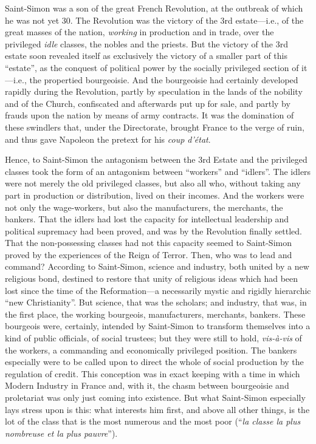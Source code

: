 Saint-Simon was a son of the great French Revolution, at the outbreak of which
he was not yet 30. The Revolution was the victory of the 3rd estate---i.e., of
the great masses of the nation, \emph{working} in production and in trade, over
the privileged \emph{idle} classes, the nobles and the priests. But the victory
of the 3rd estate soon revealed itself as exclusively the victory of a smaller
part of this ``estate'', as the conquest of political power by the socially
privileged section of it---i.e., the propertied bourgeoisie. And the bourgeoisie
had certainly developed rapidly during the Revolution, partly by speculation in
the lands of the nobility and of the Church, confiscated and afterwards put up
for sale, and partly by frauds upon the nation by means of army contracts. It
was the domination of these swindlers that, under the Directorate, brought
France to the verge of ruin, and thus gave Napoleon the pretext for his
\emph{coup d'état}.

Hence, to Saint-Simon the antagonism between the 3rd Estate and the privileged
classes took the form of an antagonism between ``workers'' and ``idlers''. The
idlers were not merely the old privileged classes, but also all who, without
taking any part in production or distribution, lived on their incomes. And the
workers were not only the wage-workers, but also the manufacturers, the
merchants, the bankers. That the idlers had lost the capacity for intellectual
leadership and political supremacy had been proved, and was by the Revolution
finally settled. That the non-possessing classes had not this capacity seemed to
Saint-Simon proved by the experiences of the Reign of Terror. Then, who was to
lead and command? According to Saint-Simon, science and industry, both united by
a new religious bond, destined to restore that unity of religious ideas which
had been lost since the time of the Reformation---a necessarily mystic and
rigidly hierarchic ``new Christianity''. But science, that was the scholars; and
industry, that was, in the first place, the working bourgeois, manufacturers,
merchants, bankers. These bourgeois were, certainly, intended by Saint-Simon to
transform themselves into a kind of public officials, of social trustees; but
they were still to hold, \emph{vis-à-vis} of the workers, a commanding and
economically privileged position. The bankers especially were to be called upon
to direct the whole of social production by the regulation of credit. This
conception was in exact keeping with a time in which Modern Industry in France
and, with it, the chasm between bourgeoisie and proletariat was only just coming
into existence. But what Saint-Simon especially lays stress upon is this: what
interests him first, and above all other things, is the lot of the class that is
the most numerous and the most poor (``\emph{la classe la plus nombreuse et la
plus pauvre}'').

